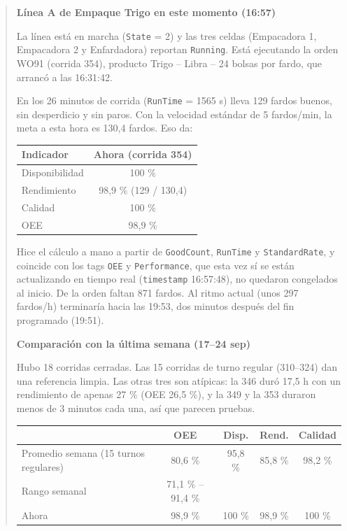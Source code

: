\begin{quote}
\small

\textbf{Línea A de Empaque Trigo en este momento (16:57)}

La línea está en marcha (\texttt{State} = 2) y las tres celdas (Empacadora 1, Empacadora 2 y Enfardadora) reportan \texttt{Running}. Está ejecutando la orden WO91 (corrida 354), producto Trigo -- Libra -- 24 bolsas por fardo, que arrancó a las 16:31:42.

En los 26 minutos de corrida (\texttt{RunTime} = 1565 s) lleva 129 fardos buenos, sin desperdicio y sin paros. Con la velocidad estándar de 5 fardos/min, la meta a esta hora es 130,4 fardos. Eso da:

\medskip
\begin{tabular}{@{}lc@{}}
\hline
\textbf{Indicador} & \textbf{Ahora (corrida 354)} \\
\hline
Disponibilidad & 100 \% \\
Rendimiento & 98,9 \% (129 / 130,4) \\
Calidad & 100 \% \\
OEE & 98,9 \% \\
\hline
\end{tabular}
\medskip

Hice el cálculo a mano a partir de \texttt{GoodCount}, \texttt{RunTime} y \texttt{StandardRate}, y coincide con los tags \texttt{OEE} y \texttt{Performance}, que esta vez sí se están actualizando en tiempo real (\texttt{timestamp} 16:57:48), no quedaron congelados al inicio. De la orden faltan 871 fardos. Al ritmo actual (unos 297 fardos/h) terminaría hacia las 19:53, dos minutos después del fin programado (19:51).

\textbf{Comparación con la última semana (17--24 sep)}

Hubo 18 corridas cerradas. Las 15 corridas de turno regular (310--324) dan una referencia limpia. Las otras tres son atípicas: la 346 duró 17,5 h con un rendimiento de apenas 27 \% (OEE 26,5 \%), y la 349 y la 353 duraron menos de 3 minutos cada una, así que parecen pruebas.

\medskip
\begin{tabular}{@{}lcccc@{}}
\hline
 & \textbf{OEE} & \textbf{Disp.} & \textbf{Rend.} & \textbf{Calidad} \\
\hline
Promedio semana (15 turnos regulares) & 80,6 \% & 95,8 \% & 85,8 \% & 98,2 \% \\
Rango semanal & 71,1 \% -- 91,4 \% & & & \\
Ahora & 98,9 \% & 100 \% & 98,9 \% & 100 \% \\
\hline
\end{tabular}
\medskip


\end{quote}
